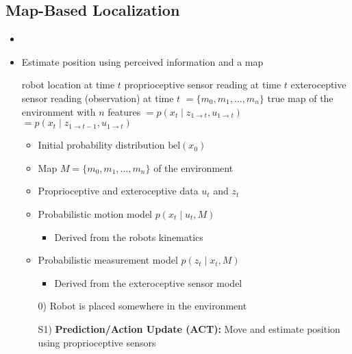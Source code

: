 \subsection{Map-Based Localization}
\begin{itemize}
    \item {}
    \item Estimate position using perceived information and a map
        \begin{itemize*}
             robot location at time $t$
             proprioceptive sensor reading at time $t$
             exteroceptive sensor reading (observation) at time $t$
            $= \{m_0, m_1, \dots, m_n\}$ true map of the environment with $n$ features
            $= p(x_t \mid z_{1 \to t}, u_{1 \to t})$
        $= p(x_t \mid z_{1 \to t - 1}, u_{1 \to t})$
        \end{itemize*}
        \begin{itemize}
            \item Initial probability distribution $\text{bel}(x_0)$
            \item Map $M = \{m_0, m_1, \dots, m_n\}$ of the environment
            \item Proprioceptive and exteroceptive data $u_t$ and $z_t$
            \item Probabilistic motion model $p(x_t \mid u_t, M)$
                \begin{itemize}
                    \item Derived from the robots kinematics
                \end{itemize}
            \item Probabilistic measurement model $p(z_t \mid x_t, M)$
                \begin{itemize}
                    \item Derived from the exteroceptive sensor model
                \end{itemize}
        \end{itemize}
        \begin{itemize}
            \item[0)] Robot is placed somewhere in the environment
            \item[S1)] \textbf{Prediction/Action Update (ACT):} Move and estimate position using proprioceptive sensors

\end{itemize}
\end{itemize}
